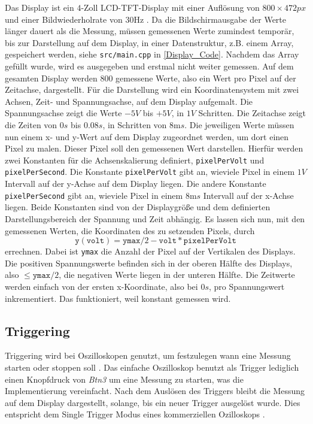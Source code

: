 Das Display ist ein $4$-Zoll LCD-TFT-Display mit einer Auflösung von \newline $800 \times 472 \si{px}$
und einer Bildwiederholrate von 30\si{\hertz} \cite{MikroControllerDatasheet_1}.
Da die Bildschirmausgabe der Werte länger dauert als die Messung, müssen gemessenen Werte
zumindest temporär, bis zur Darstellung auf dem Display, in einer Datenstruktur,
z.B. einem Array, gespeichert werden, siehe \texttt{src/main.cpp} in \ref{Display_Code}.
Nachdem das Array gefüllt wurde, wird es ausgegeben und erstmal nicht weiter gemessen.
Auf dem gesamten Display werden 800 gemessene Werte, also ein Wert pro Pixel auf der Zeitachse,
dargestellt.
\newline \newline
Für die Darstellung wird ein Koordinatensystem mit zwei Achsen, Zeit- und Spannungsachse,
auf dem Display aufgemalt.
Die Spannungsachse zeigt die Werte $-5V$ bis $+5V$, in $1V$ Schritten.
Die Zeitachse zeigt die Zeiten von $0s$ bis $0.08s$, in Schritten von $8\si{\milli s}$.
Die jeweiligen Werte müssen nun einem x- und y-Wert auf dem Display zugeordnet werden,
um dort einen Pixel zu malen. Dieser Pixel soll den gemessenen Wert darstellen. \newline
Hierfür werden zwei Konstanten für die Achsenskalierung definiert,
\texttt{pixelPerVolt} und \texttt{pixelPerSecond}.
Die Konstante \texttt{pixelPerVolt} gibt an, wieviele Pixel in einem $1V$ Intervall auf der
y-Achse auf dem Display liegen.
Die andere Konstante \texttt{pixelPerSecond} gibt an, wieviele Pixel in einem $8\si{\milli s}$ Intervall
auf der x-Achse liegen. \newline
Beide Konstanten sind von der Displaygröße und dem definierten Darstellungsbereich der Spannung und
Zeit abhängig.
Es lassen sich nun, mit den gemessenen Werten, die Koordinaten des zu setzenden
Pixels, durch
$$
\texttt{y}(\texttt{volt}) = \texttt{ymax}/2 - \texttt{volt} * \texttt{pixelPerVolt}
$$
errechnen. Dabei ist \texttt{ymax} die Anzahl der Pixel auf der Vertikalen des Displays.
Die positiven Spannungswerte befinden sich in der oberen Hälfte des Displays, also $\le \texttt{ymax}/2$,
die negativen Werte liegen in der unteren Hälfte. \newline
Die Zeitwerte werden einfach von der ersten x-Koordinate, also bei $0s$, pro Spannungswert inkrementiert.
Das funktioniert, weil konstant gemessen wird.


\subsection{Triggering}

Triggering wird bei Oszilloskopen genutzt, um festzulegen wann eine Messung starten oder stoppen soll
\cite{Oscilloscope_Trigger}.
Das einfache Oszilloskop benutzt als Trigger lediglich einen Knopfdruck von \textit{Btn3}
um eine Messung zu starten, was die Implementierung vereinfacht.
Nach dem Auslösen des Triggers bleibt die Messung auf dem Display dargestellt, solange, bis ein neuer Trigger ausgelöst wurde.
Dies entspricht dem Single Trigger Modus eines kommerziellen Ozilloskops \cite{Oscilloscope_Trigger}.
